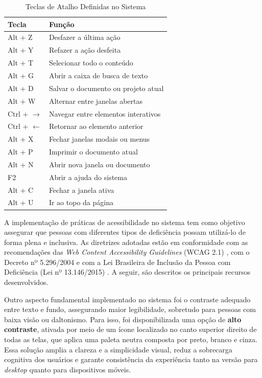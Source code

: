 \begin{table}[H]
	\caption{Teclas de Atalho Definidas no Sistema}
	\label{tab:atalhos}
	\renewcommand{\arraystretch}{1.3}
	\setlength{\tabcolsep}{8pt}
	\begin{tabular}{ll}
		\toprule
		\textbf{Tecla} & \textbf{Função} \\
		\midrule
		Alt + Z & Desfazer a última ação \\
		Alt + Y & Refazer a ação desfeita \\
		Alt + T & Selecionar todo o conteúdo \\
		Alt + G & Abrir a caixa de busca de texto \\
		Alt + D & Salvar o documento ou projeto atual \\
		Alt + W & Alternar entre janelas abertas \\
		Ctrl + $\rightarrow$ & Navegar entre elementos interativos \\
		Ctrl + $\leftarrow$ & Retornar ao elemento anterior \\
		Alt + X & Fechar janelas modais ou menus \\
		Alt + P & Imprimir o documento atual \\
		Alt + N & Abrir nova janela ou documento \\
		F2 & Abrir a ajuda do sistema \\
		Alt + C & Fechar a janela ativa \\
		Alt + U & Ir ao topo da página \\
		\bottomrule
	\end{tabular}
\end{table}

A implementação de práticas de acessibilidade no sistema tem como objetivo assegurar que pessoas com diferentes tipos de deficiência possam utilizá-lo de forma plena e inclusiva. As diretrizes adotadas estão em conformidade com as recomendações das \textit{Web Content Accessibility Guidelines} (WCAG 2.1) \parencite{WCAG2018}, com o Decreto nº 5.296/2004 \parencite{Brasil2004} e com a Lei Brasileira de Inclusão da Pessoa com Deficiência (Lei nº 13.146/2015) \parencite{Brasil2015}. A seguir, são descritos os principais recursos desenvolvidos.

Outro aspecto fundamental implementado no sistema foi o contraste adequado entre texto e fundo, assegurando maior legibilidade, sobretudo para pessoas com baixa visão ou daltonismo. Para isso, foi disponibilizada uma opção de \textbf{alto contraste}, ativada por meio de um ícone localizado no canto superior direito de todas as telas, que aplica uma paleta neutra composta por preto, branco e cinza. Essa solução amplia a clareza e a simplicidade visual, reduz a sobrecarga cognitiva dos usuários e garante consistência da experiência tanto na versão para \textit{desktop} quanto para dispositivos móveis.

